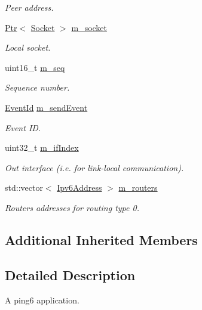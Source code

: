\begin{DoxyCompactItemize}
\begin{DoxyCompactList}\small\item\em Peer address. \end{DoxyCompactList}\item 
\hyperlink{classns3_1_1Ptr}{Ptr}$<$ \hyperlink{classns3_1_1Socket}{Socket} $>$ \hyperlink{classns3_1_1Ping6_a906684b14d88122f2a16b4a9d241194d}{m\+\_\+socket}
\begin{DoxyCompactList}\small\item\em Local socket. \end{DoxyCompactList}\item 
uint16\+\_\+t \hyperlink{classns3_1_1Ping6_a951109c23d5e308328e22f41ec2ce3de}{m\+\_\+seq}
\begin{DoxyCompactList}\small\item\em Sequence number. \end{DoxyCompactList}\item 
\hyperlink{classns3_1_1EventId}{Event\+Id} \hyperlink{classns3_1_1Ping6_a4a3a1991d21fbcc690af300d303ee552}{m\+\_\+send\+Event}
\begin{DoxyCompactList}\small\item\em Event ID. \end{DoxyCompactList}\item 
uint32\+\_\+t \hyperlink{classns3_1_1Ping6_a13e483e25f42538d74bebc41c31f2779}{m\+\_\+if\+Index}
\begin{DoxyCompactList}\small\item\em Out interface (i.\+e. for link-\/local communication). \end{DoxyCompactList}\item 
std\+::vector$<$ \hyperlink{classns3_1_1Ipv6Address}{Ipv6\+Address} $>$ \hyperlink{classns3_1_1Ping6_a6f3aa884473637142689ee9bae07394f}{m\+\_\+routers}
\begin{DoxyCompactList}\small\item\em Routers addresses for routing type 0. \end{DoxyCompactList}\end{DoxyCompactItemize}
\subsection*{Additional Inherited Members}


\subsection{Detailed Description}
A ping6 application. 

